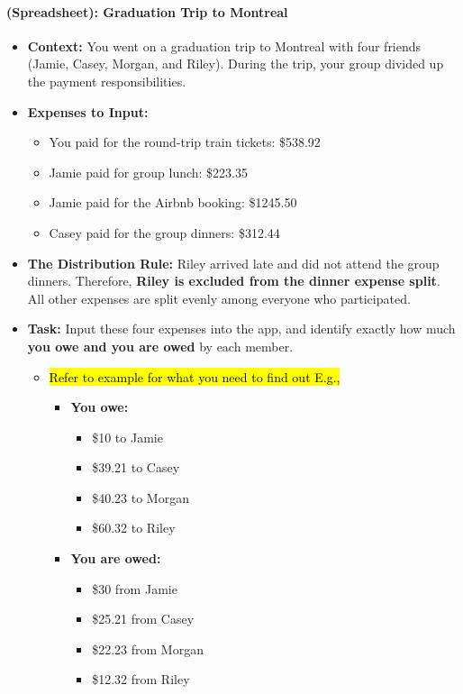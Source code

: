 \documentclass[12pt,a4paper]{article}
\begin{document}
\paragraph{(Spreadsheet): Graduation Trip to Montreal}
\begin{itemize}
    \item \textbf{Context:} You went on a graduation trip to Montreal with four friends (Jamie, Casey, Morgan, and Riley). During the trip, your group divided up the payment responsibilities.
    
    \item \textbf{Expenses to Input:}
    \begin{itemize}
        \item You paid for the round-trip train tickets: \$538.92
        \item Jamie paid for group lunch: \$223.35
        \item Jamie paid for the Airbnb booking: \$1245.50
        \item Casey paid for the group dinners: \$312.44
    \end{itemize}
    
    \item \textbf{The Distribution Rule:} Riley arrived late and did not attend the group dinners. Therefore, \textbf{Riley is excluded from the dinner expense split}. All other expenses are split evenly among everyone who participated.
    
    \item \textbf{Task:} Input these four expenses into the app, and identify exactly how much \textbf{you owe and you are owed} by each member.
    \begin{itemize}
        \item \hl{Refer to example for what you need to find out E.g.,}
        \begin{itemize}
            \item \textbf{You owe:}
            \begin{itemize}
                \item \$10 to Jamie
                \item \$39.21 to Casey
                \item \$40.23 to Morgan
                \item \$60.32 to Riley
            \end{itemize}
            \item \textbf{You are owed:}
            \begin{itemize}
                \item \$30 from Jamie
                \item \$25.21 from Casey
                \item \$22.23 from Morgan
                \item \$12.32 from Riley
            \end{itemize}
        \end{itemize}
    \end{itemize}
\end{itemize}
\end{document}
